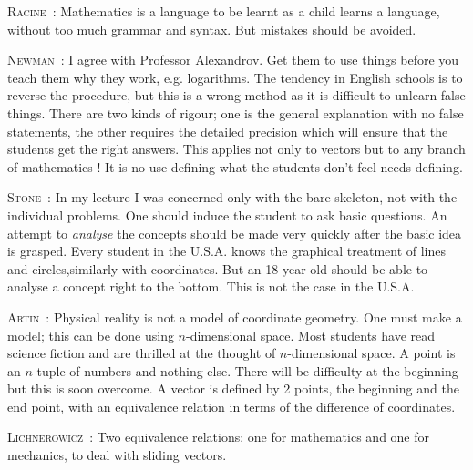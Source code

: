 \smallskip
\noindent
\textsc{Racine}~: Mathematics is a language to be learnt as a child learns a language, without too much grammar and syntax. But mistakes should be avoided.

\smallskip
\noindent
\textsc{Newman}~: I agree with Professor Alexandrov. Get them to use things before you teach them why they work, e.g. logarithms. The tendency in English schools is to reverse the procedure, but this is a wrong method as it is difficult to unlearn false things. There are two kinds of rigour; one is the general explanation with no false statements, the other requires the detailed precision which will ensure that the students get the right answers. This applies not only to vectors but to any branch of mathematics ! It is no use defining what the students don't feel needs defining.

\smallskip
\noindent
\textsc{Stone}~: In my lecture I was concerned only with the bare skeleton, not with the individual problems. One should induce the student to ask basic questions. An attempt to {\em analyse} the concepts should be made very quickly after the basic idea is grasped. Every student in the U.S.A. knows the graphical treatment of lines and circles,\pageoriginale similarly with coordinates. But an 18 year old should be able to analyse a concept right to the bottom. This is not the case in the U.S.A.

\smallskip
\noindent
\textsc{Artin}~: Physical reality is not a model of coordinate geometry. One must make a model; this can be done using $n$-dimensional space. Most students have read science fiction and are thrilled at the thought of $n$-dimensional space. A point is an $n$-tuple of numbers and nothing else. There will be difficulty at the beginning but this is soon overcome. A vector is defined by 2 points, the beginning and the end point, with an equivalence relation in terms of the difference of coordinates.

\smallskip
\noindent
\textsc{Lichnerowicz}~: Two equivalence relations; one for mathematics and one for mechanics, to deal with sliding vectors.


